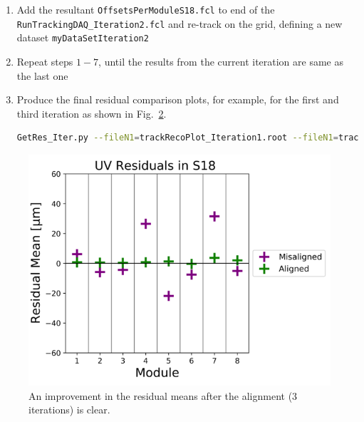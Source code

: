 \documentclass[12pt]{article}
\begin{document}
\begin{enumerate}
\begin{figure}[h!]
        \caption{The alignment results with $10^5$ tracks after 2 iterations. The alignment stability is not yet reached, as seen by the alignment results from the previous iteration (shown in black) and current iteration (purple) not converged.}
        \label{fig:Align_Data}
    \end{figure}
     \item Add the resultant \verb!OffsetsPerModuleS18.fcl! to end of the \\ \verb!RunTrackingDAQ_Iteration2.fcl! and re-track on the grid, defining a new dataset \texttt{myDataSetIteration2}
     \item Repeat steps $1-7$, until the results from the current iteration are same as the last one
      \item Produce the final residual comparison plots, for example, for the first and third iteration as shown in Fig.~\ref{fig:Res_Data}.
     \begin{lstlisting}[language=bash] 
     GetRes_Iter.py --fileN1=trackRecoPlot_Iteration1.root --fileN1=trackRecoPlot_Iteration3.root  \end{lstlisting}
     \end{enumerate}
     \begin{figure}[ht]
    \centering
    \includegraphics[width = 0.5\linewidth]{fig/Res_Data.png}
    \caption{An improvement in the residual means after the alignment (3 iterations) is clear.}
    \label{fig:Res_Data}
    \end{figure}
\end{document}
